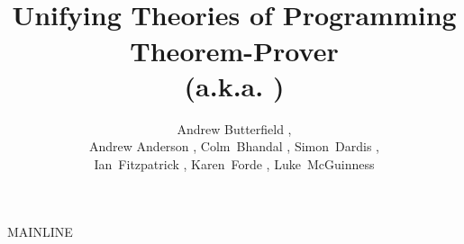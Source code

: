 \documentclass[fleqn,10pt]{report}
\author{
  Andrew Butterfield%
  ,\\Andrew Anderson%
  , Colm~Bhandal%
  , Simon~Dardis%
  ,\\Ian~Fitzpatrick%
  , Karen~Forde%
  , Luke~McGuinness%
  }
\title{\UTP2
  \\{\normalsize
      Unifying Theories of Programming Theorem-Prover
  \\  (a.k.a. \Saoithin)}
}
\begin{document}


\maketitle
\tableofcontents

\newpage






 MAINLINE
\newpage


\newpage


%
\end{document}
